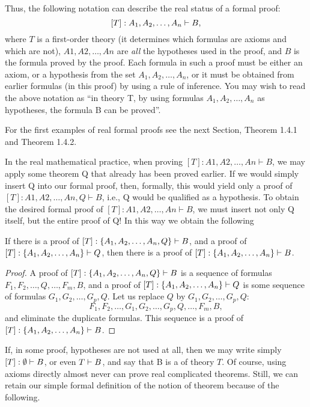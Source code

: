 Thus, the following notation can describe the real status of a formal proof:
\[
[T]: A_1, A_2, \ldots , A_n\vdash B,
\]
where \(T\) is a first-order theory (it determines which formulas are axioms and which are not), \(A1, A2, \ldots , An\) are \emph{all} the hypotheses used in the proof, and \(B\) is the formula proved by the proof.
Each formula in such a proof must be either an axiom, or a hypothesis from the set \(A_1, A_2, \ldots , A_n\), or it must be obtained from earlier formulas (in this proof) by using a rule of inference.
You may wish to read the above notation as ``in theory T, by using formulas \(A_1, A_2, \ldots , A_n\) as hypotheses, the formula B can be proved''.

For the first examples of real formal proofs see the next Section, Theorem 1.4.1 and Theorem 1.4.2.

In the real mathematical practice, when proving \([T]: A1, A2, \ldots , An \vdash B\), we may apply some theorem Q that already has been proved earlier. If we would simply insert Q into our formal proof, then, formally,
this would yield only a proof of \([T]: A1, A2, \ldots , An, Q \vdash B\), i.e., Q would be qualified as a hypothesis. To
obtain the desired formal proof of \([T]: A1, A2, \ldots , An \vdash B\), we must insert not only Q itself, but the entire
proof of Q! In this way we obtain the following

\begin{theorem}\label{131}
If there is a proof of \([T]: \{A_1, A_2, \ldots, A_n, Q\}\vdash B\), and a proof of \([T]: \{A_1, A_2, \ldots, A_n\}\vdash Q\), then there is a proof of \([T]: \{A_1, A_2, \ldots, A_n\}\vdash B\).
\end{theorem}
\begin{proof}
A proof of \([T]: \{A_1, A_2, \ldots, A_n, Q\}\vdash B\) is a sequence of formulas \(F_1, F_2, \ldots, Q, \ldots, F_m, B\), and a proof of \([T]: \{A_1, A_2, \ldots, A_n\}\vdash Q\) is some sequence of formulas \(G_1, G_2, \ldots , G_p, Q\).
Let us replace \(Q\) by \(G_1, G_2, \ldots, G_p, Q\):
\[
F_1, F_2, \ldots , G_1, G_2, \ldots, G_p, Q, \ldots, F_m, B,
\]
and eliminate the duplicate formulas.
This sequence is a proof of \([T]: \{A_1, A_2, \ldots, A_n\}\vdash B\).
\end{proof}

If, in some proof, hypotheses are not used at all, then we may write simply \([T]: \emptyset\vdash B\), or even \(T\vdash B\), and say that B is a  of theory \(T\).
Of course, using axioms directly almost never can prove real complicated theorems. Still, we can retain our simple formal definition of the notion of theorem because of the following.

